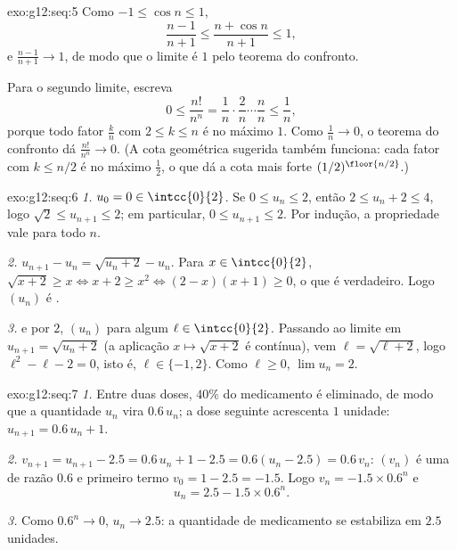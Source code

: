 \begin{solution}{exo:g12:seq:5}
Como $-1 \leq \cos n \leq 1$,
\[
\frac{n-1}{n+1} \leq \frac{n + \cos n}{n+1} \leq 1,
\]
e $\frac{n-1}{n+1} \to 1$, de modo que o limite é $1$ pelo teorema do
confronto.

Para o segundo limite, escreva
\[
0 \leq \frac{n!}{n^n}
= \frac{1}{n}\cdot\frac{2}{n}\cdots\frac{n}{n}
\leq \frac{1}{n},
\]
porque todo fator $\frac{k}{n}$ com $2 \leq k \leq n$ é no máximo $1$.
Como $\frac1n \to 0$, o teorema do confronto dá
$\frac{n!}{n^n} \to 0$. (A cota geométrica sugerida também funciona: cada
fator com $k \leq n/2$ é no máximo $\frac12$, o que dá a cota mais forte
$(1/2)^{\floor{n/2}}$.)
\end{solution}

\begin{solution}{exo:g12:seq:6}
\emph{1.} $u_0 = 0 \in \intcc{0}{2}$. Se $0 \leq u_n \leq 2$, então
$2 \leq u_n + 2 \leq 4$, logo $\sqrt{2} \leq u_{n+1} \leq 2$; em
particular, $0 \leq u_{n+1} \leq 2$. Por indução, a propriedade vale para
todo $n$.

\emph{2.} $u_{n+1} - u_n = \sqrt{u_n + 2} - u_n$. Para
$x \in \intcc{0}{2}$,
$\sqrt{x+2} \geq x \iff x + 2 \geq x^2 \iff (2-x)(x+1) \geq 0$, o que é
verdadeiro. Logo $(u_n)$ é .

\emph{3.}  e  por $2$, $(u_n)$ 
para algum $\ell \in \intcc{0}{2}$. Passando ao limite em
$u_{n+1} = \sqrt{u_n + 2}$ (a aplicação $x \mapsto \sqrt{x+2}$ é
contínua), vem $\ell = \sqrt{\ell + 2}$, logo $\ell^2 - \ell - 2 = 0$,
isto é, $\ell \in \{-1, 2\}$. Como $\ell \geq 0$, $\lim u_n = 2$.
\end{solution}

\begin{solution}{exo:g12:seq:7}
\emph{1.} Entre duas doses, $40\%$ do medicamento é eliminado, de modo que
a quantidade $u_n$ vira $0.6\,u_n$; a dose seguinte acrescenta $1$
unidade: $u_{n+1} = 0.6\,u_n + 1$.

\emph{2.} $v_{n+1} = u_{n+1} - 2.5 = 0.6\,u_n + 1 - 2.5 = 0.6(u_n - 2.5)
= 0.6\,v_n$: $(v_n)$ é uma  de razão $0.6$ e primeiro
termo $v_0 = 1 - 2.5 = -1.5$. Logo $v_n = -1.5 \times 0.6^n$ e
\[
u_n = 2.5 - 1.5 \times 0.6^n .
\]

\emph{3.} Como $0.6^n \to 0$, $u_n \to 2.5$: a quantidade de medicamento
se estabiliza em $2.5$ unidades.
\end{solution}

